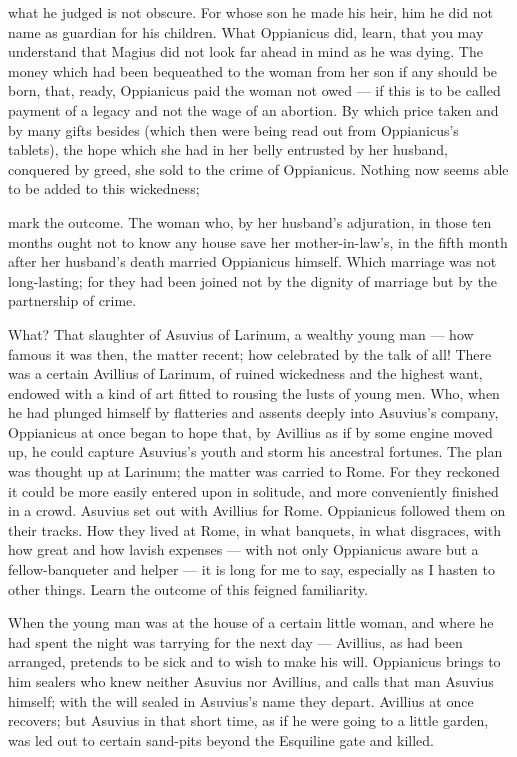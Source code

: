  what he judged is not obscure. For whose son he made his heir, him he did not name as guardian for his children. What Oppianicus did, learn, that you may understand that Magius did not look far ahead in mind as he was dying. The money which had been bequeathed to the woman from her son if any should be born, that, ready, Oppianicus paid the woman not owed --- if this is to be called payment of a legacy and not the wage of an abortion. By which price taken and by many gifts besides (which then were being read out from Oppianicus's tablets), the hope which she had in her belly entrusted by her husband, conquered by greed, she sold to the crime of Oppianicus. Nothing now seems able to be added to this wickedness;

 mark the outcome. The woman who, by her husband's adjuration, in those ten months ought not to know any house save her mother-in-law's, in the fifth month after her husband's death married Oppianicus himself. Which marriage was not long-lasting; for they had been joined not by the dignity of marriage but by the partnership of crime.

 What? That slaughter of Asuvius of Larinum, a wealthy young man --- how famous it was then, the matter recent; how celebrated by the talk of all! There was a certain Avillius of Larinum, of ruined wickedness and the highest want, endowed with a kind of art fitted to rousing the lusts of young men. Who, when he had plunged himself by flatteries and assents deeply into Asuvius's company, Oppianicus at once began to hope that, by Avillius as if by some engine moved up, he could capture Asuvius's youth and storm his ancestral fortunes. The plan was thought up at Larinum; the matter was carried to Rome. For they reckoned it could be more easily entered upon in solitude, and more conveniently finished in a crowd. Asuvius set out with Avillius for Rome. Oppianicus followed them on their tracks. How they lived at Rome, in what banquets, in what disgraces, with how great and how lavish expenses --- with not only Oppianicus aware but a fellow-banqueter and helper --- it is long for me to say, especially as I hasten to other things. Learn the outcome of this feigned familiarity.

 When the young man was at the house of a certain little woman, and where he had spent the night was tarrying for the next day --- Avillius, as had been arranged, pretends to be sick and to wish to make his will. Oppianicus brings to him sealers who knew neither Asuvius nor Avillius, and calls that man Asuvius himself; with the will sealed in Asuvius's name they depart. Avillius at once recovers; but Asuvius in that short time, as if he were going to a little garden, was led out to certain sand-pits beyond the Esquiline gate and killed.

